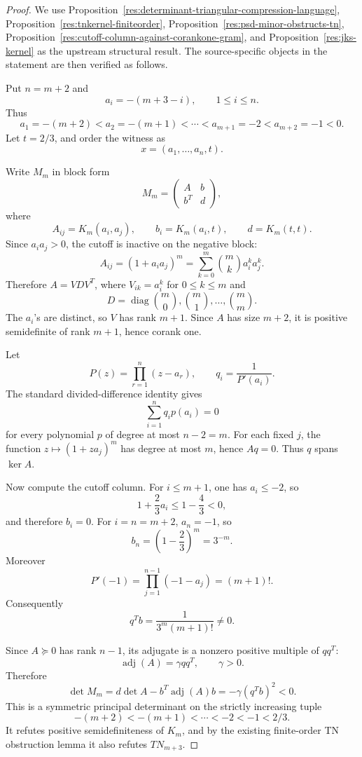 \documentclass[11pt]{article}
\numberwithin{equation}{section}
\theoremstyle{definition}
\theoremstyle{remark}
\newcommand{\1}{\mathbf 1}
\begin{document}
\begin{proof}
We use Proposition~\ref{res:determinant-triangular-compression-language}, Proposition~\ref{res:tnkernel-finiteorder}, Proposition~\ref{res:psd-minor-obstructs-tn}, Proposition~\ref{res:cutoff-column-against-corankone-gram}, and Proposition~\ref{res:jks-kernel} as the upstream structural result. The source-specific objects in the statement are then verified as follows.

Put \(n=m+2\) and
\[
a_i=-(m+3-i),\qquad 1\le i\le n.
\]
Thus
\[
a_1=-(m+2)<a_2=-(m+1)<\cdots<a_{m+1}=-2<a_{m+2}=-1<0.
\]
Let \(t=2/3\), and order the witness as
\[
x=(a_1,\ldots,a_n,t).
\]

Write \(M_m\) in block form
\[
M_m=\begin{pmatrix}A&b\\ b^T&d\end{pmatrix},
\]
where
\[
A_{ij}=K_m(a_i,a_j),\qquad b_i=K_m(a_i,t),\qquad d=K_m(t,t).
\]
Since \(a_i a_j>0\), the cutoff is inactive on the negative block:
\[
A_{ij}=(1+a_i a_j)^m
=\sum_{k=0}^m \binom{m}{k}a_i^k a_j^k.
\]
Therefore \(A=VDV^T\), where \(V_{ik}=a_i^k\) for \(0\le k\le m\) and
\[
D=\operatorname{diag}\binom{m}{0},\binom{m}{1},\ldots,\binom{m}{m}.
\]
The \(a_i\)'s are distinct, so \(V\) has rank \(m+1\). Since \(A\) has size
\(m+2\), it is positive semidefinite of rank \(m+1\), hence corank one.

Let
\[
P(z)=\prod_{r=1}^n(z-a_r),\qquad q_i=\frac{1}{P'(a_i)}.
\]
The standard divided-difference identity gives
\[
\sum_{i=1}^n q_i p(a_i)=0
\]
for every polynomial \(p\) of degree at most \(n-2=m\). For each fixed \(j\),
the function \(z\mapsto(1+za_j)^m\) has degree at most \(m\), hence \(Aq=0\).
Thus \(q\) spans \(\ker A\).

Now compute the cutoff column. For \(i\le m+1\), one has \(a_i\le -2\), so
\[
1+\frac23 a_i\le 1-\frac43<0,
\]
and therefore \(b_i=0\). For \(i=n=m+2\), \(a_n=-1\), so
\[
b_n=\left(1-\frac23\right)^m=3^{-m}.
\]
Moreover
\[
P'(-1)=\prod_{j=1}^{n-1}(-1-a_j)=(m+1)!.
\]
Consequently
\[
q^T b=\frac{1}{3^m(m+1)!}\ne0.
\]

Since \(A\succeq0\) has rank \(n-1\), its adjugate is a nonzero positive
multiple of \(qq^T\):
\[
\operatorname{adj}(A)=\gamma qq^T,\qquad \gamma>0.
\]
Therefore
\[
\det M_m
=d\det A-b^T\operatorname{adj}(A)b
=-\gamma(q^Tb)^2<0.
\]
This is a symmetric principal determinant on the strictly increasing tuple
\[
-(m+2)<-(m+1)<\cdots<-2<-1<2/3.
\]
It refutes positive semidefiniteness of \(K_m\), and by the existing
finite-order TN obstruction lemma it also refutes \(TN_{m+3}\).


\end{proof}
\end{document}
